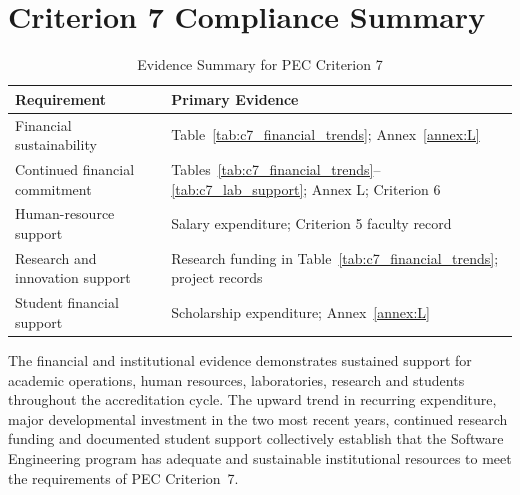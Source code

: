 \hypertarget{criterion7-compliance-summary}{%
\section{Criterion 7 Compliance Summary}\label{criterion7-compliance-summary}}

\begin{table}[H]
\centering
\caption{Evidence Summary for PEC Criterion 7}
\label{tab:c7_evidence_summary}
\begingroup\footnotesize
\setlength{\tabcolsep}{7pt}
\renewcommand{\arraystretch}{1.08}
\begin{tabular}{@{}p{}p{}@{}}
\toprule
\textbf{Requirement} & \textbf{Primary Evidence} \\
\midrule
Financial sustainability & Table~\ref{tab:c7_financial_trends}; Annex~\ref{annex:L} \\
Continued financial commitment & Tables~\ref{tab:c7_financial_trends}--\ref{tab:c7_lab_support}; Annex L; Criterion 6 \\
Human-resource support & Salary expenditure; Criterion 5 faculty record \\
Research and innovation support & Research funding in Table~\ref{tab:c7_financial_trends}; project records \\
Student financial support & Scholarship expenditure; Annex~\ref{annex:L} \\
\bottomrule
\end{tabular}
\endgroup
\end{table}

The financial and institutional evidence demonstrates sustained support for academic operations, human resources, laboratories, research and students throughout the accreditation cycle. The upward trend in recurring expenditure, major developmental investment in the two most recent years, continued research funding and documented student support collectively establish that the Software Engineering program has adequate and sustainable institutional resources to meet the requirements of PEC Criterion~7.
